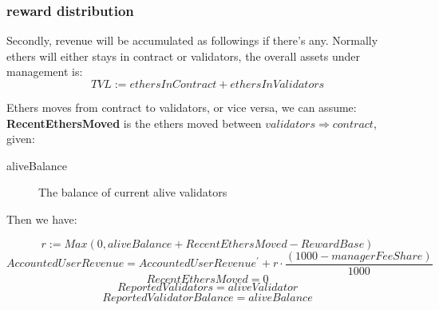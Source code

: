\documentclass{article}
\begin{document}
\subsubsection{reward distribution}
Secondly, revenue will be accumulated as followings if there's any. Normally ethers will either stays in contract or validators, the overall assets under management is:
\[TVL := ethersInContract + ethersInValidators\]

Ethers moves from contract to validators, or vice versa, we can assume: \textbf{RecentEthersMoved} is the ethers moved between ${validators}\Longrightarrow{contract}$, given:

\begin{description}
\item[aliveBalance] The balance of current alive validators
\end{description}


Then we have:
\begin{theorem}[calcReward]
\label{calcReward}
\[r := Max(0, aliveBalance + RecentEthersMoved - RewardBase)\]
\[AccountedUserRevenue = AccountedUserRevenue^{\prime} + r \cdot \frac{(1000 - managerFeeShare)}{1000}\]
\[RecentEthersMoved = 0\]
\[ReportedValidators = aliveValidator\]
\[ReportedValidatorBalance = aliveBalance\]
\end{theorem}
\end{document}
